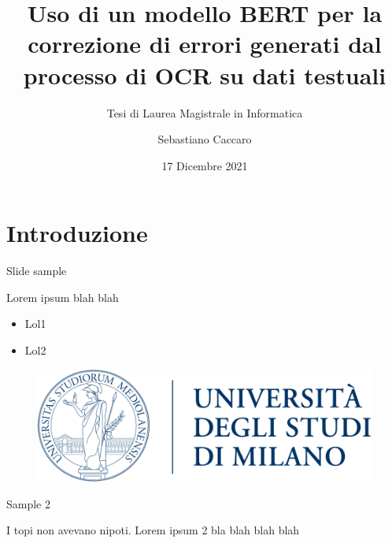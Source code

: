 \documentclass{beamer}
\title{Uso di un modello BERT per la correzione di errori generati dal processo di OCR su dati testuali}
\subtitle{Tesi di Laurea Magistrale in Informatica}
\author{Sebastiano Caccaro}
\date{17 Dicembre 2021}
\begin{document}
	\maketitle



	\section{Introduzione}
	\begin{frame}{Slide sample}

		Lorem ipsum blah blah

		\begin{itemize}
			\item Lol1
			\item Lol2
		\end{itemize}
		
		\begin{figure}
			\includegraphics[scale=0.2]{images/unipd-logo}
		\end{figure}
	\end{frame}
	
	\begin{frame}{Sample 2}
	
	I topi non avevano nipoti.
	\newline \newline
	Lorem ipsum 2
	\newline \newline
	bla blah blah blah
	
	\end{frame}
\end{document}
